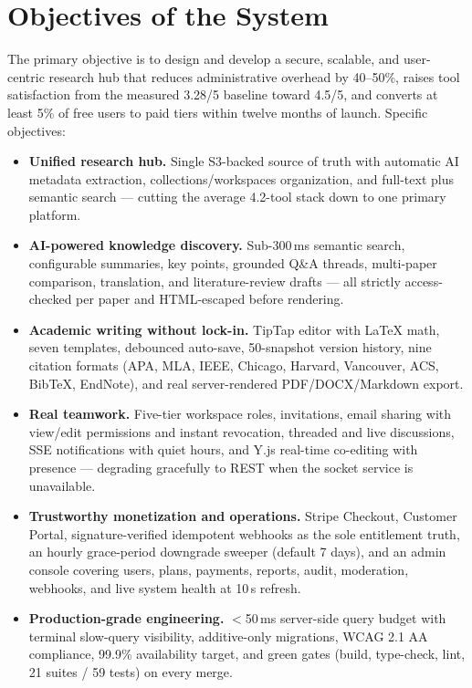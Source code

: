 \section{Objectives of the System}
The primary objective is to design and develop a secure, scalable, and
user-centric research hub that reduces administrative overhead by 40--50\%,
raises tool satisfaction from the measured 3.28/5 baseline toward 4.5/5, and
converts at least 5\% of free users to paid tiers within twelve months of
launch. Specific objectives:

\begin{itemize}
\item \textbf{Unified research hub.} Single S3-backed source of truth with
  automatic AI metadata extraction, collections/workspaces organization, and
  full-text plus semantic search --- cutting the average 4.2-tool stack down
  to one primary platform.
\item \textbf{AI-powered knowledge discovery.} Sub-300\,ms semantic search,
  configurable summaries, key points, grounded Q\&A threads, multi-paper
  comparison, translation, and literature-review drafts --- all strictly
  access-checked per paper and HTML-escaped before rendering.
\item \textbf{Academic writing without lock-in.} TipTap editor with LaTeX
  math, seven templates, debounced auto-save, 50-snapshot version history,
  nine citation formats (APA, MLA, IEEE, Chicago, Harvard, Vancouver, ACS,
  BibTeX, EndNote), and real server-rendered PDF/DOCX/Markdown export.
\item \textbf{Real teamwork.} Five-tier workspace roles, invitations, email
  sharing with view/edit permissions and instant revocation, threaded and live
  discussions, SSE notifications with quiet hours, and Y.js real-time
  co-editing with presence --- degrading gracefully to REST when the socket
  service is unavailable.
\item \textbf{Trustworthy monetization and operations.} Stripe Checkout,
  Customer Portal, signature-verified idempotent webhooks as the sole
  entitlement truth, an hourly grace-period downgrade sweeper (default 7
  days), and an admin console covering users, plans, payments, reports,
  audit, moderation, webhooks, and live system health at 10\,s refresh.
\item \textbf{Production-grade engineering.} $<$50\,ms server-side query
  budget with terminal slow-query visibility, additive-only migrations,
  WCAG 2.1 AA compliance, 99.9\% availability target, and green gates (build,
  type-check, lint, 21 suites / 59 tests) on every merge.
\end{itemize}
